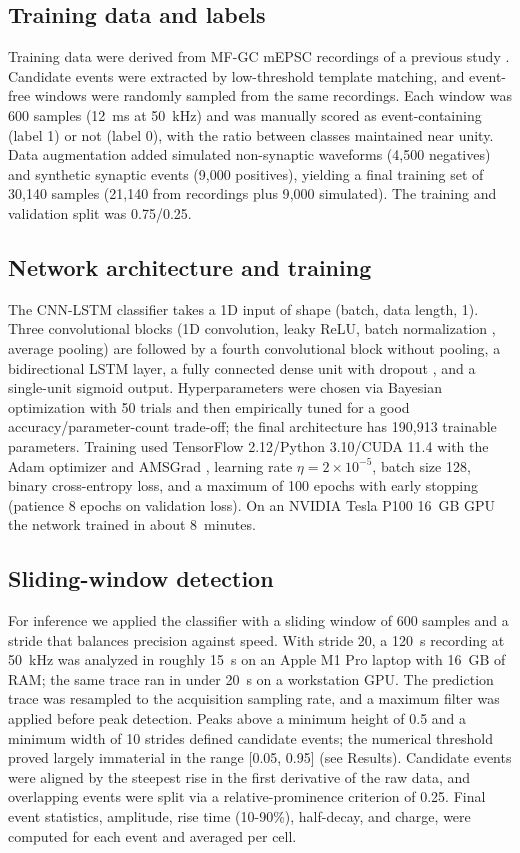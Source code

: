 \documentclass[11pt]{article}
\begin{document}
\subsection{Training data and labels}
Training data were derived from MF-GC mEPSC recordings of a previous study
\citep{delvendahl2019mfgc}. Candidate events were extracted by low-threshold
template matching, and event-free windows were randomly sampled from the
same recordings. Each window was 600 samples (12~ms at 50~kHz) and was
manually scored as event-containing (label 1) or not (label 0), with the
ratio between classes maintained near unity. Data augmentation added
simulated non-synaptic waveforms (4{,}500 negatives) and synthetic synaptic
events (9{,}000 positives), yielding a final training set of 30{,}140
samples (21{,}140 from recordings plus 9{,}000 simulated). The training and
validation split was 0.75/0.25.

\subsection{Network architecture and training}
The CNN-LSTM classifier takes a 1D input of shape (batch, data length, 1).
Three convolutional blocks (1D convolution, leaky ReLU, batch normalization
\citep{ioffe2015batchnorm}, average pooling) are followed by a fourth
convolutional block without pooling, a bidirectional LSTM layer, a fully
connected dense unit with dropout \citep{srivastava2014dropout}, and a
single-unit sigmoid output. Hyperparameters were chosen via Bayesian
optimization with 50 trials and then empirically tuned for a good
accuracy/parameter-count trade-off; the final architecture has 190{,}913
trainable parameters. Training used TensorFlow 2.12/Python 3.10/CUDA 11.4
with the Adam optimizer and AMSGrad \citep{kingma2014adam}, learning rate
$\eta = 2\times 10^{-5}$, batch size 128, binary cross-entropy loss, and a
maximum of 100 epochs with early stopping (patience 8 epochs on validation
loss). On an NVIDIA Tesla P100 16~GB GPU the network trained in about
8~minutes.

\subsection{Sliding-window detection}
For inference we applied the classifier with a sliding window of 600
samples and a stride that balances precision against speed. With stride 20,
a 120~s recording at 50~kHz was analyzed in roughly 15~s on an Apple M1 Pro
laptop with 16~GB of RAM; the same trace ran in under 20~s on a workstation
GPU. The prediction trace was resampled to the acquisition sampling rate,
and a maximum filter was applied before peak detection. Peaks above a
minimum height of 0.5 and a minimum width of 10 strides defined candidate
events; the numerical threshold proved largely immaterial in the range
[0.05, 0.95] (see Results). Candidate events were aligned by the steepest
rise in the first derivative of the raw data, and overlapping events were
split via a relative-prominence criterion of 0.25. Final event statistics,
amplitude, rise time (10-90\%), half-decay, and charge, were computed for
each event and averaged per cell.
\end{document}
